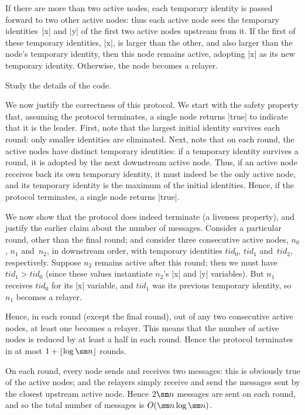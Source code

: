 If there are more than two active nodes, each temporary identity is passed
forward to two other active nodes: thus each active node sees the temporary
identities~|x| and |y| of the first two active nodes upstream from it.  If the
first of these temporary identities, |x|, is larger than the other, and also
larger than the node's temporary identity, then this node remains active,
adopting |x| as its new temporary identity.  Otherwise, the node becomes a
relayer.



\begin{instruction}
Study the details of the code.
\end{instruction}

We now justify the correctness of this protocol.  We start with the safety
property that, assuming the protocol terminates, a single node returns |true|
to indicate that it is the leader.  First, note that the largest initial
identity survives each round: only smaller identities are eliminated.  Next,
note that on each round, the active nodes have distinct temporary identities:
if a temporary identity survives a round, it is adopted by the next downstream
active node.  Thus, if an active node receives back its own temporary
identity, it must indeed be the only active node, and its temporary identity
is the maximum of the initial identities.  Hence, if the protocol terminates,
a single node returns |true|.

We now show that the protocol does indeed terminate (a liveness property), and
justify the earlier claim about the number of messages.  Consider a particular
round, other than the final round; and consider three consecutive active
nodes, $n_0$, $n_1$ and~$n_2$, in downstream order, with temporary identities
$tid_0$, $tid_1$ and~$tid_2$, respectively.  Suppose $n_2$ remains active
after this round; then we must have $tid_1 > tid_0$ (since these values
instantiate $n_2$'s |x| and |y| variables).  But $n_1$ receives $tid_0$ for
its |x| variable, and $tid_1$ was its previous temporary identity, so $n_1$
becomes a relayer.

Hence, in each round (except the final round), out of any two consecutive
active nodes, at least one becomes a relayer.  This means that the number of
active nodes is reduced by at least a half in each round.  Hence the protocol
terminates in at most $1 + \lfloor \log \sm n \rfloor$ rounds.

On each round, every node sends and receives two messages: this is obviously
true of the active nodes; and the relayers simply receive and send the
messages sent by the closest upstream active node.  Hence $2 \sm n$ messages
are sent on each round, and so the total number of messages is $O(\sm n \log
\sm n)$.
